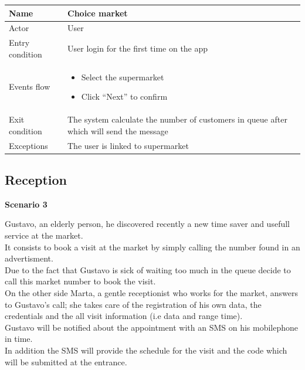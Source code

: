 \par \medskip

\begin{tabular}{|p{5cm} | p{7cm} | }
	\hline
	Name & Choice market  \\
	\hline
	Actor & User \\
	\hline
	Entry condition &
	User login for the first time on the app \\
	\hline
	Events flow & 
	\begin{itemize}
		\item Select the supermarket
		\item Click “Next” to confirm
	\end{itemize} \\
	\hline
	Exit condition &
	The system calculate the number of customers in queue after which will send the message  \\
	\hline 
	Exceptions & 
	The user is linked to supermarket \\
	\hline
\end{tabular}

\par \medskip

\subsection{Reception}
\par \medskip
{\normalsize \textbf{Scenario 3}}
\par \medskip
 Gustavo, an elderly person, he discovered recently a new time saver and usefull service at the market. \\
 It consists to book a visit at the market by simply calling the number found in an advertisment. \\
 Due to the fact that Gustavo is sick of waiting too much in the queue decide to call this market number to book the visit. \\
 On the other side Marta, a gentle receptionist who works for the market, answers to Gustavo's call; she takes care of the registration of his own data, the credentials and the all visit information (i.e data and range time).\\
  Gustavo will be notified about the appointment with an SMS on his mobilephone in time. \\
  In addition the SMS will provide the schedule for the visit and the code which will be submitted at the entrance.
 
 \par \medskip 
 
